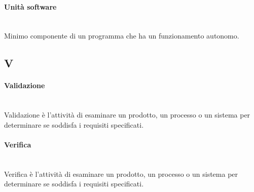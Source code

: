 \paragraph{Unità software}~\smallskip \\
Minimo componente di un programma che ha un funzionamento autonomo.
\newpage
{}
\subsection*{V}
\paragraph{Validazione}~\smallskip \\
Validazione è l'attività di esaminare un prodotto, un processo o un sistema per determinare se soddisfa i requisiti specificati.

\paragraph{Verifica}~\smallskip \\
Verifica è l'attività di esaminare un prodotto, un processo o un sistema per determinare se soddisfa i requisiti specificati.




